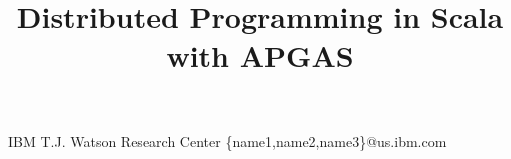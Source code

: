 \documentclass[preprint,10pt]{sigplanconf}
\begin{document}
\setlength{\pdfpageheight}{\paperheight}
\setlength{\pdfpagewidth}{\paperwidth}




\permissiontopublish             %


\title{Distributed Programming in Scala with APGAS}

           {IBM T.J. Watson Research Center}
           {\{name1,name2,name3\}@us.ibm.com}

\maketitle

\begin{abstract}

\end{abstract}


% 






%





\end{document}
